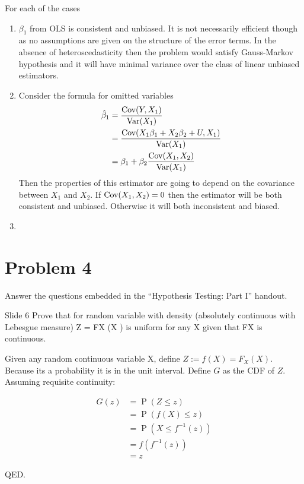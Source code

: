 \documentclass{article}
\begin{document}
\begin{solution}
For each of the cases
\begin{enumerate}[label=(\alph*)]
    \item $\beta_1$ from OLS is consistent and unbiased. It is not necessarily efficient though as no assumptions are given on the structure of the error terms. In the absence of heteroscedasticity then the problem would satisfy Gauss-Markov hypothesis and it will have minimal variance over the class of linear unbiased estimators. 
    \item Consider the formula for omitted variables
    \begin{align*}
        \hat{\beta}_1 &= \frac{\text{Cov}(Y,X_1)}{\text{Var}(X_1)} \\ 
        &= \frac{\text{Cov}(X_1\beta_1+X_2\beta_2+U,X_1)}{\text{Var}(X_1)} \\ 
        &= \beta_1 + \beta_2\frac{\text{Cov}(X_1,X_2)}{\text{Var}(X_1)}
    \end{align*}
    Then the properties of this estimator are going to depend on the covariance between $X_1$ and $X_2$. If $\text{Cov}(X_1,X_2)=0$ then the estimator will be both consistent and unbiased. Otherwise it will both inconsistent and biased. 
    \item 
\end{enumerate}

\end{solution}

\newpage

\section*{Problem 4}
Answer the questions embedded in the ``Hypothesis Testing: Part I'' handout.

\begin{problem}{Slide 6}
Prove that for random variable with density (absolutely continuous with
Lebesgue measure) Z = FX (X ) is uniform for any X given
that FX is continuous.
\end{problem}

\begin{solution}
Given any random continuous variable X, define $Z := f(X) = F_X(X)$. Because its a probability it is in the unit interval. Define $G$ as the CDF of $Z$. Assuming requisite continuity:

\begin{align*}
G(z) &= \operatorname{P}(Z\leq z) \\
        &= \operatorname{P}(f(X)\leq z) \\
        &= \operatorname{P}(X\leq f^{-1}(z)) \\
        &= f (f^{-1}(z)) \\
        &= z
\end{align*}

QED.

\end{solution}
\end{document}
